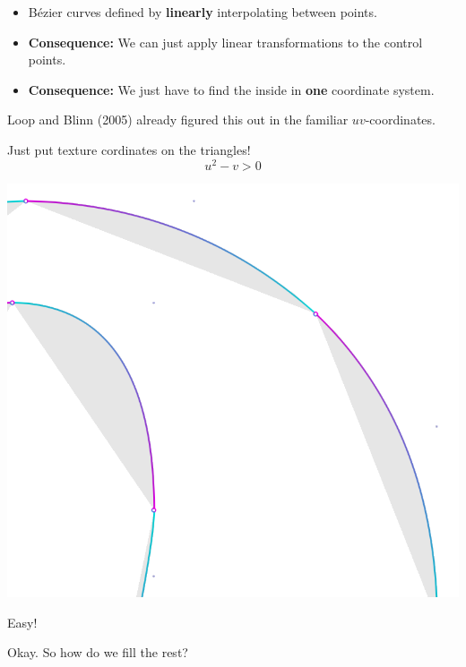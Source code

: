 \documentclass[14pt]{beamer}
\begin{document}
\begin{frame}
    \begin{itemize}
        \item<1-> Bézier curves defined by \textbf{linearly} interpolating between points.
        \item<2-> \textbf{Consequence:} We can just apply linear transformations to the control points.
        \item<3-> \textbf{Consequence:} We just have to find the inside in \textbf{one} coordinate system.
    \end{itemize}
    \pause
    \pause
    Loop and Blinn (2005) already figured this out in the familiar $uv$-coordinates.
\end{frame}

\begin{frame}
    \centering
    Just put texture cordinates on the triangles!
    \begin{equation}
        u^2 - v > 0
    \end{equation}
\end{frame}

\begin{frame}
    \centering
    \includegraphics[height=0.625\textheight]{demo/outlines.png}

    Easy!
\end{frame}

\begin{frame}
    \centering
    Okay. So how do we fill the rest?
\end{frame}
\end{document}

